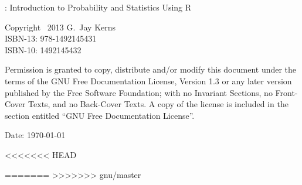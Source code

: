 %
%

\setcounter{page}{2}

\noindent \IPSUR: Introduction to Probability and Statistics Using \textsf{R}

\noindent Copyright \textcopyright~2013 G.~Jay Kerns \\ 
\noindent ISBN-13: 978-1492145431 \\ 
\noindent ISBN-10: 1492145432 \\ 
\medskip{}

\noindent Permission is granted to copy, distribute and/or modify this
document under the terms of the GNU Free Documentation License,
Version 1.3 or any later version published by the Free Software
Foundation; with no Invariant Sections, no Front-Cover Texts, and no
Back-Cover Texts. A copy of the license is included in the section
entitled ``GNU Free Documentation License''.

\vspace{0.25in}
\noindent Date: \today
\noindent \vfill{}

\cleardoublepage
{}
{}

\tableofcontents{}
<<<<<<< HEAD


=======
>>>>>>> gnu/master
